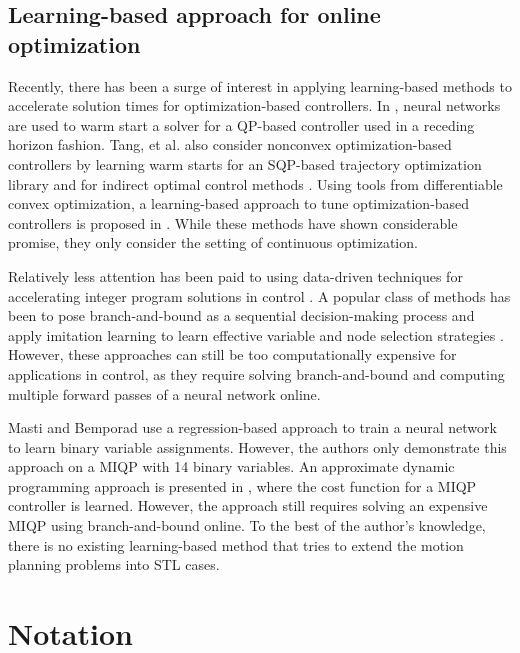 \documentclass[a4paper]{report}
\begin{document}
\subsection{Learning-based approach for online optimization}
Recently, there has been a surge of interest in applying learning-based methods to accelerate solution times for optimization-based controllers. In \cite[]{chen2022large}\cite[]{zhang2019safe}, neural networks are used to warm start a solver for a QP-based controller used in a receding horizon fashion. Tang, et al.\cite[]{tang2018learning} also consider nonconvex optimization-based controllers by learning warm starts for an SQP-based trajectory optimization library and for indirect optimal control methods \cite[]{tang2019data}. Using tools from differentiable convex optimization, a learning-based approach to tune optimization-based controllers is proposed in \cite[]{agrawal2020learning}. While these methods have shown considerable promise, they only consider the setting of continuous optimization.

Relatively less attention has been paid to using data-driven
techniques for accelerating integer program solutions in control \cite[]{bengio2021machine}\cite[]{lodi2017learning}. A popular class of methods has been to pose branch-and-bound as a sequential decision-making process and apply imitation learning to learn effective variable and node selection strategies \cite[]{khalil2017learning}\cite[]{he2014learning}. However, these approaches can still be too computationally expensive for applications in control, as they require solving branch-and-bound and computing multiple forward passes of a neural network online.

Masti and Bemporad \cite[]{masti2019learning} use a regression-based approach to train a neural network to learn binary variable assignments. However, the authors only demonstrate this approach on a MIQP with 14 binary variables. An approximate dynamic programming approach is presented in \cite[]{deits2019lvis}, where the cost function for a MIQP controller is learned. However, the approach still requires solving an expensive MIQP using branch-and-bound online. To the best of the author's knowledge, there is no existing learning-based method that tries to extend the motion planning problems into STL cases.

\section{Notation}
\end{document}
